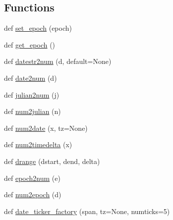 \subsection*{Functions}
\begin{DoxyCompactItemize}
\item 
def \hyperlink{namespacematplotlib_1_1dates_adde3fd7f7341998765df8ebe23ac00d1}{set\+\_\+epoch} (epoch)
\item 
def \hyperlink{namespacematplotlib_1_1dates_ae6353b45ff67fc42ceee4922fbc8a774}{get\+\_\+epoch} ()
\item 
def \hyperlink{namespacematplotlib_1_1dates_a1aa957751b42c05fd0545f4eeb9f8b15}{datestr2num} (d, default=None)
\item 
def \hyperlink{namespacematplotlib_1_1dates_a48721f97cdd620c5cc7573a689f2793c}{date2num} (d)
\item 
def \hyperlink{namespacematplotlib_1_1dates_a2d561ed462a5cee845b40f90dd09fab2}{julian2num} (j)
\item 
def \hyperlink{namespacematplotlib_1_1dates_af0b43cb1db9b87a4dcd605e71938bc49}{num2julian} (n)
\item 
def \hyperlink{namespacematplotlib_1_1dates_aa42eebf54c03fafaef7987f4d4b58738}{num2date} (x, tz=None)
\item 
def \hyperlink{namespacematplotlib_1_1dates_ae3d5785cdee585c83253c587fac80324}{num2timedelta} (x)
\item 
def \hyperlink{namespacematplotlib_1_1dates_adb2949a7d987acfc70682fe50ddc796f}{drange} (dstart, dend, delta)
\item 
def \hyperlink{namespacematplotlib_1_1dates_ae10f26f7ee1271c0f285ba1e49cbe8c8}{epoch2num} (e)
\item 
def \hyperlink{namespacematplotlib_1_1dates_a49fa1e84c38e615141b843afbf3b2810}{num2epoch} (d)
\item 
def \hyperlink{namespacematplotlib_1_1dates_a3a32363e47b679988576a4f25a44b314}{date\+\_\+ticker\+\_\+factory} (span, tz=None, numticks=5)
\end{DoxyCompactItemize}
